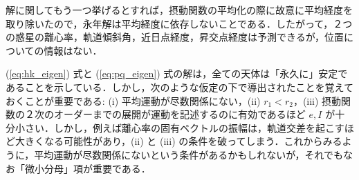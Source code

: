 \documentclass[11pt,a4paper,oneside,onecolumn]{jarticle}
\begin{document}
解に関してもう一つ挙げるとすれば，摂動関数の平均化の際に故意に平均経度を取り除いたので，永年解は平均経度に依存しないことである．したがって，２つの惑星の離心率，軌道傾斜角，近日点経度，昇交点経度は予測できるが，位置についての情報はない．

(\ref{eq:hk_eigen}) 式と (\ref{eq:pq_eigen}) 式の解は，全ての天体は「永久に」安定であることを示している．しかし，次のような仮定の下で導出されたことを覚えておくことが重要である: (i) 平均運動が尽数関係にない，(ii) $r_1 < r_2$，(iii) 摂動関数の２次のオーダーまでの展開が運動を記述するのに有効であるほど $e, I$ が十分小さい．しかし，例えば離心率の固有ベクトルの振幅は，軌道交差を起こすほど大きくなる可能性があり，(ii) と (iii) の条件を破ってしまう．これからみるように，平均運動が尽数関係にないという条件があるかもしれないが，それでもなお「微小分母」項が重要である．
\end{document}
